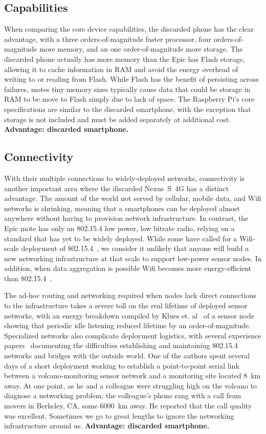 \subsection{Capabilities}

When comparing the core device capabilities, the discarded phone has the
clear advantage, with a three orders-of-magnitude faster processor, four
orders-of-magnitude more memory, and an one order-of-magnitude more storage.
The discarded phone actually has more memory than the Epic has Flash storage,
allowing it to cache information in RAM and avoid the energy overhead of
writing to or reading from Flash. While Flash has the benefit of persisting
across failures, motes tiny memory sizes typically cause data that could be
storage in RAM to be move to Flash simply due to lack of space. The Raspberry
Pi's core specifications are similar to the discarded smartphone, with the
exception that storage is not included and must be added separately at
additional cost. \textbf{Advantage: discarded smartphone.}

\subsection{Connectivity}

With their multiple connections to widely-deployed networks, connectivity is
another important area where the discarded Nexus~S~4G has a distinct
advantage. The amount of the world not served by cellular, mobile data, and
Wifi networks is shrinking, meaning that a smartphones can be deployed almost
anywhere without having to provision network infrastructure. In contrast, the
Epic mote has only an 802.15.4 low power, low bitrate radio, relying on a
standard that has yet to be widely deployed. While some have called for a
Wifi-scale deployment of 802.15.4~\cite{FIXME-leaves}, we consider it
unlikely that anyone will build a new networking infrastructure at that scale
to support low-power sensor nodes. In addition, when data aggregation is
possible Wifi becomes more energy-efficient than
802.15.4~\cite{FIXME-wificost}.

The ad-hoc routing and networking required when nodes lack direct connections
to the infrastructure takes a severe toll on the real lifetime of deployed
sensor networks, with an energy breakdown compiled by Klues et.
al~\cite{icem-sosp07} of a sensor node showing that periodic idle listening
reduced lifetime by an order-of-magnitude. Specialized networks also
complicate deployment logistics, with several experience
papers~\cite{volcano-osdi06,FIXME-hitchhikers} documenting the difficulties
establishing and maintaining 802.15.4 networks and bridges with the outside
world. One of the authors spent several days of a short deployment working to
establish a point-to-point serial link between a volcano-monitoring sensor
network and a monitoring site located 8~km away. At one point, as he and a
colleague were struggling high on the volcano to diagnose a networking
problem, the colleague's phone rang with a call from movers in Berkeley, CA,
some \num{6000}~km away. He reported that the call quality was excellent.
Sometimes we go to great lengths to ignore the networking infrastructure
around us. \textbf{Advantage: discarded smartphone.}

